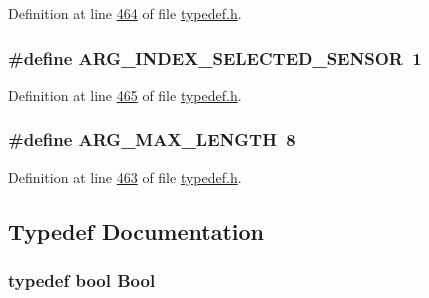 Definition at line \hyperlink{a00001_source_l00464}{464} of file \hyperlink{a00001_source}{typedef.\+h}.

\hypertarget{a00001_a10ac6c7d790fd11db043965e8d08c9ad}{
\subsubsection[{A\+R\+G\+\_\+\+I\+N\+D\+E\+X\+\_\+\+S\+E\+L\+E\+C\+T\+E\+D\+\_\+\+S\+E\+N\+S\+O\+R}]{\setlength{\rightskip}{0pt plus 5cm}\#define A\+R\+G\+\_\+\+I\+N\+D\+E\+X\+\_\+\+S\+E\+L\+E\+C\+T\+E\+D\+\_\+\+S\+E\+N\+S\+O\+R~1}}\label{a00001_a10ac6c7d790fd11db043965e8d08c9ad}


Definition at line \hyperlink{a00001_source_l00465}{465} of file \hyperlink{a00001_source}{typedef.\+h}.

\hypertarget{a00001_a8060d7351beb9451f5f6e3b692e2d9c3}{
\subsubsection[{A\+R\+G\+\_\+\+M\+A\+X\+\_\+\+L\+E\+N\+G\+T\+H}]{\setlength{\rightskip}{0pt plus 5cm}\#define A\+R\+G\+\_\+\+M\+A\+X\+\_\+\+L\+E\+N\+G\+T\+H~8}}\label{a00001_a8060d7351beb9451f5f6e3b692e2d9c3}


Definition at line \hyperlink{a00001_source_l00463}{463} of file \hyperlink{a00001_source}{typedef.\+h}.



\subsection{Typedef Documentation}
\hypertarget{a00001_a76a8b016e5ad61faf9062cc387df5016}{
\subsubsection[{Bool}]{\setlength{\rightskip}{0pt plus 5cm}typedef bool {\bf Bool}}}\label{a00001_a76a8b016e5ad61faf9062cc387df5016}


